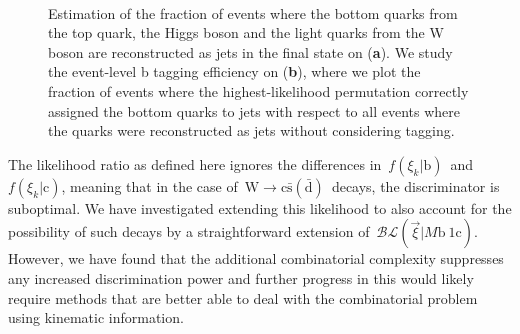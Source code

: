 \begin{figure}
\begin{centering}
\\
\caption[Fraction of events with correct matching to the hard process]{Estimation of the fraction of events where the bottom quarks from the top quark, the Higgs boson and the light quarks from the W boson are reconstructed as jets in the final state on (\textbf{a}). We study the event-level b tagging efficiency on (\textbf{b}), where we plot the fraction of events where the highest-likelihood permutation correctly assigned the bottom quarks to jets with respect to all events where the quarks were reconstructed as jets without considering tagging.}
\label{fig:blr_matching}
\end{centering}
\end{figure}
 
The likelihood ratio as defined here ignores the differences in~$f(\xi_k | \mathrm{b})$~and~$f(\xi_k | \mathrm{c})$, meaning that in the case of~$\mathrm{W} \rightarrow \mathrm{c}\bar{\mathrm{s}} (\bar{\mathrm{d}})$~decays, the discriminator is suboptimal. We have investigated extending this likelihood to also account for the possibility of such decays by a straightforward extension of~$\mathcal{BL}(\vec{\xi} | M\mathrm{b}~1\mathrm{c})$. However, we have found that the additional combinatorial complexity suppresses any increased discrimination power and further progress in this would likely require methods that are better able to deal with the combinatorial problem using kinematic information.

